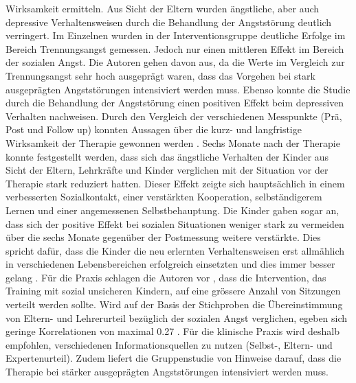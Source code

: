 Wirksamkeit ermitteln. Aus Sicht der Eltern wurden ängstliche, aber auch depressive Verhaltensweisen durch die Behandlung der Angststörung deutlich verringert. Im Einzelnen wurden in der Interventionsgruppe deutliche Erfolge im Bereich Trennungsangst gemessen. Jedoch nur einen mittleren Effekt im Bereich der sozialen Angst. Die Autoren gehen davon aus, da die Werte im Vergleich zur Trennungsangst sehr hoch ausgeprägt waren, dass das Vorgehen bei stark ausgeprägten Angststörungen intensiviert werden muss. Ebenso konnte die Studie durch die Behandlung der Angststörung einen positiven Effekt beim depressiven Verhalten nachweisen. Durch den Vergleich der verschiedenen Messpunkte (Prä, Post und Follow up) konnten Aussagen über die kurz- und langfristige Wirksamkeit der Therapie gewonnen werden \cite{Moller:2011}. Sechs Monate nach der Therapie konnte festgestellt werden, dass sich das ängstliche Verhalten der Kinder aus Sicht der Eltern, Lehrkräfte und Kinder verglichen mit der Situation vor der Therapie stark reduziert hatten. Dieser Effekt zeigte sich hauptsächlich in einem verbesserten Sozialkontakt, einer verstärkten Kooperation, selbständigerem Lernen und einer angemessenen Selbstbehauptung. Die Kinder gaben sogar an, dass sich der positive Effekt bei sozialen Situationen weniger stark zu vermeiden über die sechs Monate gegenüber der Postmessung weitere verstärkte. Dies spricht dafür, dass die Kinder die neu erlernten Verhaltensweisen erst allmählich in verschiedenen Lebensbereichen erfolgreich einsetzten und dies immer besser gelang \cite{Moller:2011}. Für die Praxis schlagen die Autoren vor \cite{Petermann:2015}, dass die Intervention, das Training mit sozial unsicheren Kindern, auf eine grössere Anzahl von Sitzungen verteilt werden sollte. Wird auf der Basis der Stichproben die Übereinstimmung von Eltern- und Lehrerurteil bezüglich der sozialen Angst verglichen, egeben sich geringe Korrelationen von maximal 0.27 \cite{Moller:2011}. Für die klinische Praxis wird deshalb empfohlen, verschiedenen Informationsquellen zu nutzen (Selbst-, Eltern- und Expertenurteil). Zudem liefert die Gruppenstudie von  Hinweise darauf, dass die Therapie bei stärker ausgeprägten Angststörungen intensiviert werden muss.








